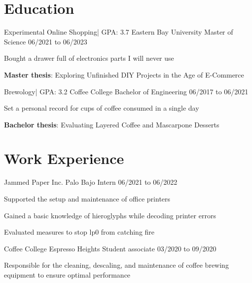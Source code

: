 %
%
%
%

\section{Education}
\begin{resumeList}  {Experimental Online Shopping}{| GPA: 3.7}    {Eastern Bay University}
                    {Master of Science}                 {06/2021 to 06/2023}
    \item Bought a drawer full of electronics parts I will never use
    \item \textbf{Master thesis}: Exploring Unfinished DIY Projects in the Age of E-Commerce
\end{resumeList}
\begin{resumeList}  {Brewology}{| GPA: 3.2}                {Coffee College}
                    {Bachelor of Engineering}    {06/2017 to 06/2021}
    \item Set a personal record for cups of coffee consumed in a single day
    \item \textbf{Bachelor thesis}: Evaluating Layered Coffee and Mascarpone Desserts
\end{resumeList}


\section{Work Experience}
\begin{resumeList}  {Jammed Paper Inc.}{}    {Palo Bajo}
                    {Intern}                       {06/2021 to 06/2022}
    \item Supported the setup and maintenance of office printers
    \item Gained a basic knowledge of hieroglyphs while decoding printer errors
    \item Evaluated measures to stop lp0 from catching fire
\end{resumeList}
\begin{resumeList}  {Coffee College}{}    {Espresso Heights}
                    {Student associate}                {03/2020 to 09/2020}
    \item Responsible for the cleaning, descaling, and maintenance of coffee brewing equipment to ensure optimal performance
\end{resumeList}


